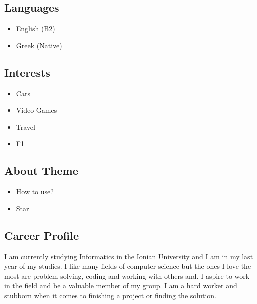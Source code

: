 \documentclass[english,]{article}
\providecommand{\tightlist}{%
  \setlength{\itemsep}{0pt}\setlength{\parskip}{0pt}}
\begin{document}
\hypertarget{languages}{%
\subsection{Languages}\label{languages}}

\begin{itemize}
\tightlist
\item
  English {(B2)}
\item
  Greek {(Native)}
\end{itemize}

\hypertarget{interests}{%
\subsection{Interests}\label{interests}}

\begin{itemize}
\tightlist
\item
  Cars
\item
  Video Games
\item
  Travel
\item
  F1
\end{itemize}

\hypertarget{about-theme}{%
\subsection{About Theme}\label{about-theme}}

\begin{itemize}
\tightlist
\item
  \href{https://www.youtube.com/watch?v=Jnmj1dXDbNk}{How to use?}
\item
  \href{https://github.com/sharu725/online-cv}{Star}
\end{itemize}

\hypertarget{career-profile}{%
\subsection{\texorpdfstring{{ \emph{} \emph{} } Career
Profile}{    Career Profile}}\label{career-profile}}

I am currently studying Informatics in the Ionian University and I am in
my last year of my studies. I like many fields of computer science but
the ones I love the most are problem solving, coding and working with
others and. I aspire to work in the field and be a valuable member of my
group. I am a hard worker and stubborn when it comes to finishing a
project or finding the solution.
\end{document}
